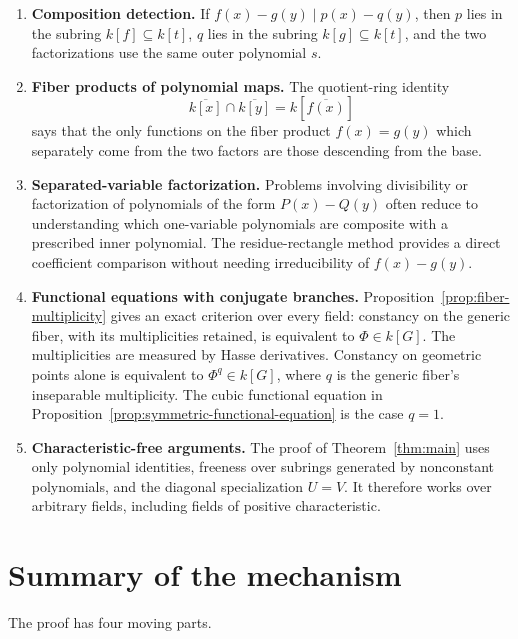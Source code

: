 \documentclass[11pt]{article}
\theoremstyle{plain}
\theoremstyle{definition}
\theoremstyle{remark}
\newcommand{\U}{U}
\newcommand{\V}{V}
\newcommand{\ol}[1]{\overline{#1}}
\begin{document}
\begin{enumerate}
    \item \textbf{Composition detection.}
    If \(f(x)-g(y)\mid p(x)-q(y)\), then \(p\) lies in the subring \(k[f]\subseteq k[t]\), \(q\) lies in the subring \(k[g]\subseteq k[t]\), and the two factorizations use the same outer polynomial \(s\).

    \item \textbf{Fiber products of polynomial maps.}
    The quotient-ring identity
    \[
        \ol{k[x]}\cap \ol{k[y]}
        =
        k[\ol{f(x)}]
    \]
    says that the only functions on the fiber product \(f(x)=g(y)\) which separately come from the two factors are those descending from the base.

    \item \textbf{Separated-variable factorization.}
    Problems involving divisibility or factorization of polynomials of the form \(P(x)-Q(y)\) often reduce to understanding which one-variable polynomials are composite with a prescribed inner polynomial. The residue-rectangle method provides a direct coefficient comparison without needing irreducibility of \(f(x)-g(y)\).

    \item \textbf{Functional equations with conjugate branches.}
    Proposition~\ref{prop:fiber-multiplicity} gives an exact criterion over every field: constancy on the generic fiber, with its multiplicities retained, is equivalent to \(\Phi\in k[G]\). The multiplicities are measured by Hasse derivatives. Constancy on geometric points alone is equivalent to \(\Phi^q\in k[G]\), where \(q\) is the generic fiber's inseparable multiplicity. The cubic functional equation in Proposition~\ref{prop:symmetric-functional-equation} is the case \(q=1\).

    \item \textbf{Characteristic-free arguments.}
    The proof of Theorem~\ref{thm:main} uses only polynomial identities, freeness over subrings generated by nonconstant polynomials, and the diagonal specialization \(\U=\V\). It therefore works over arbitrary fields, including fields of positive characteristic.
\end{enumerate}

\clearpage
\section{Summary of the mechanism}

The proof has four moving parts.
\end{document}
